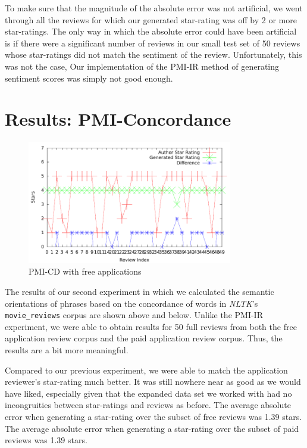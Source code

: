 \documentclass[11pt]{report} %
\begin{document}
To make sure that the magnitude of the absolute error was not artificial, we went through all the reviews for which our generated star-rating was off by 2 or more star-ratings. The only way in which the absolute error could have been artificial is if there were a significant number of reviews in our small test set of 50 reviews whose star-ratings did not match the sentiment of the review. Unfortunately, this was not the case, Our implementation of the PMI-IR method of generating sentiment scores was simply not good enough.

	\section{Results: PMI-Concordance}
	
	\begin{figure}[H]
	\centering
	\includegraphics[width=0.8\textwidth]{data/pmi-cd-free.pdf}
	\caption{PMI-CD with free applications}
	\label{fig:pmi-cd-free}
	\end{figure}

The results of our second experiment in which we calculated the semantic orientations of phrases based on the concordance of words in \textit{NLTK}'s \verb|movie_reviews| corpus are shown above and below. Unlike the PMI-IR experiment, we were able to obtain results for 50 full reviews from both the free application review corpus and the paid application review corpus. Thus, the results are a bit more meaningful.

Compared to our previous experiment, we were able to match the application reviewer's star-rating much better. It was still nowhere near as good as we would have liked, especially given that the expanded data set we worked with had no incongruities between star-ratings and reviews as before. The average absolute error when generating a star-rating over the subset of free reviews was 1.39 stars. The average absolute error when generating a star-rating over the subset of paid reviews was 1.39 stars.
	
\end{document}
